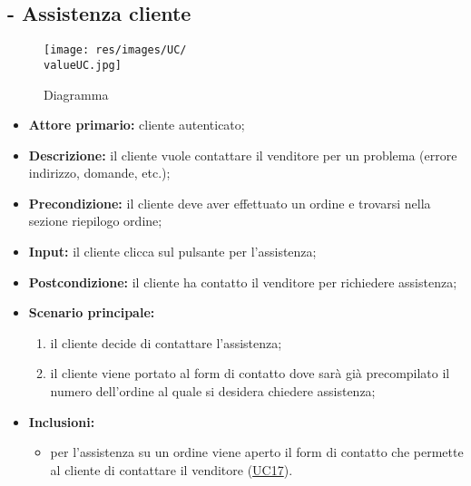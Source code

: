 \subsection{ - Assistenza cliente}
\begin{figure}[H]
    \centering
    \texttt{[image: res/images/UC/\\valueUC.jpg]}
    \caption{Diagramma }
\end{figure}
\begin{itemize}
    \item \textbf{Attore primario:} cliente autenticato;
    \item \textbf{Descrizione:} il cliente vuole contattare il venditore per un problema (errore indirizzo, domande, etc.);
    \item \textbf{Precondizione:}  il cliente deve aver effettuato un ordine e trovarsi nella sezione riepilogo ordine;
    \item \textbf{Input:} il cliente clicca sul pulsante per l'assistenza;
    \item \textbf{Postcondizione:} il cliente ha contatto il venditore per richiedere assistenza;
    \item \textbf{Scenario principale:}
          \begin{enumerate}
              \item il cliente decide di contattare l'assistenza;
              \item il cliente viene portato al form di contatto dove sarà già precompilato il numero dell'ordine al quale si desidera chiedere assistenza;
          \end{enumerate}
    \item \textbf{Inclusioni:}
          \begin{itemize}
              \item per l'assistenza su un ordine viene aperto il form di contatto che permette al cliente di contattare il venditore (\hyperref[UC17]{UC17}).
          \end{itemize}
\end{itemize}

\stepUserCase
